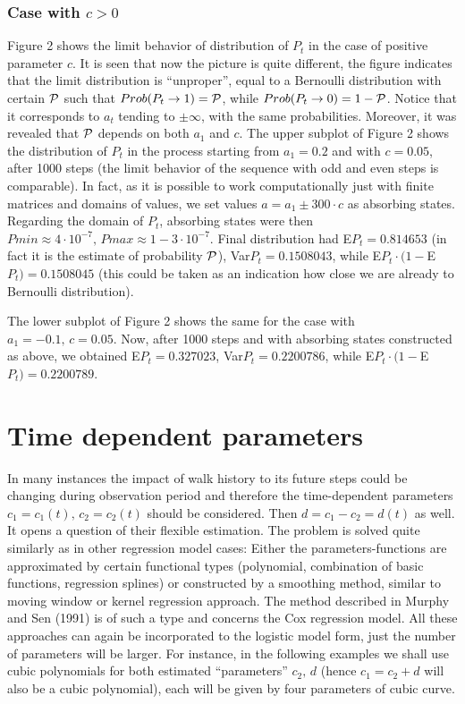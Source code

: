 \documentclass[11pt]{article}
\begin{document}
\subsubsection{Case with $c>0$}

Figure 2 shows the limit behavior of distribution of $P_t$ in the case of positive parameter $c$. 
It is seen that now the picture is quite different, the figure indicates that the limit distribution is
``unproper'', equal to a Bernoulli distribution with certain $\cal{P}$ such that $Prob(P_t\to 1)=\cal{P}$, while $Prob(P_t\to 0)=1-\cal{P}$.
Notice that it corresponds to $a_t$ tending to $\pm \infty$, with the same probabilities.
Moreover, it was revealed that $\cal{P}$ depends on both $a_1$ and $c$.
The upper subplot of Figure 2 shows the distribution of $P_t$ in 
the process starting from $a_1=0.2$ and with $c=0.05$, after 1000 steps 
(the limit behavior of the sequence with odd and even steps is comparable).
In fact, as it is possible to work computationally just with finite matrices and domains of values, we set values
$a=a_1\pm 300\cdot c$ as absorbing states. Regarding the domain of $P_t$, absorbing states were then
$Pmin\approx 4\cdot 10^{-7},\, Pmax\approx 1-3\cdot 10^{-7}$. Final distribution had
E$P_t = 0.814653$ (in fact it is the estimate of probability $\cal{P}$), Var$P_t=0.1508043$, while E$P_t\cdot (1-$E$P_t)=0.1508045$
(this could be taken as an indication how close we are already to Bernoulli distribution).

The lower subplot of Figure 2 shows the same for the case with $a_1=-0.1,\,c=0.05$.
Now, after 1000 steps and with absorbing states constructed as above, we obtained
E$P_t = 0.327023$, Var$P_t=0.2200786$, while E$P_t\cdot (1-$E$P_t)=0.2200789$.


\section{Time dependent parameters}

In many instances the impact of walk history
to its future steps could be changing during observation period and
therefore the time-dependent parameters $c_1=c_1(t),\,c_2=c_2(t)$
should be considered. Then $d=c_1-c_2=d(t)$ as well. It opens a
question of their flexible estimation. The problem is solved quite
similarly as in other regression model cases: Either the
parameters-functions are approximated by certain functional types
(polynomial, combination of basic functions, regression splines)
or constructed by a smoothing method, similar to moving window or
kernel regression approach. The method described in Murphy and Sen
(1991) is of such a type and  concerns the Cox regression model. All these approaches can again be
incorporated to the logistic model form, just the number of
parameters will be larger. For instance, in the following examples
we shall use cubic polynomials for both estimated ``parameters''
$c_2,\, d$ (hence $c_1=c_2+d$ will also be a cubic polynomial),
each will be given by four parameters of cubic curve.
\end{document}
